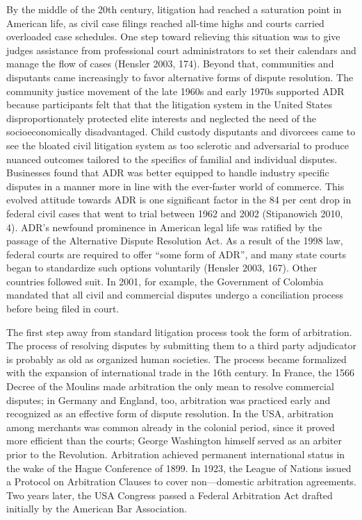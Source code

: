 By the middle of the 20th century, litigation had reached a saturation point in American life, as civil case filings reached all-time highs and courts carried overloaded case schedules. One step toward relieving this situation was to give judges assistance from professional court administrators to set their calendars and manage the flow of cases (Hensler 2003, 174). Beyond that, communities and disputants came increasingly to favor alternative forms of dispute resolution. The community justice movement of the late 1960s and early 1970s supported ADR because participants felt that that the litigation system in the United States disproportionately protected elite interests and neglected the need of the socioeconomically disadvantaged. Child custody disputants and divorcees came to see the bloated civil litigation system as too sclerotic and adversarial to produce nuanced outcomes tailored to the specifics of familial and individual disputes. Businesses found that ADR was better equipped to handle industry specific disputes in a manner more in line with the ever-faster world of commerce. This evolved attitude towards ADR is one significant factor in the 84 per cent drop in federal civil cases that went to trial between 1962 and 2002 (Stipanowich 2010, 4). ADR's newfound prominence in American legal life was ratified by the passage of the Alternative Dispute Resolution Act. As a result of the 1998 law, federal courts are required to offer ``some form of ADR'', and many state courts began to standardize such options voluntarily (Hensler 2003, 167). Other countries followed suit. In 2001, for example, the Government of Colombia mandated that all civil and commercial disputes undergo a conciliation process before being filed in court.

The first step away from standard litigation process took the form of arbitration. The process of resolving disputes by submitting them to a third party adjudicator is probably as old as organized human societies. The process became formalized with the expansion of international trade in the 16th century. In France, the 1566 Decree of the Moulins made arbitration the only mean to resolve commercial disputes; in Germany and England, too, arbitration was practiced early and recognized as an effective form of dispute resolution. In the USA, arbitration among merchants was common already in the colonial period, since it proved more efficient than the courts; George Washington himself served as an arbiter prior to the Revolution. Arbitration achieved permanent international status in the wake of the Hague Conference of 1899. In 1923, the League of Nations issued a Protocol on Arbitration Clauses to cover non---domestic arbitration agreements. Two years later, the USA Congress passed a Federal Arbitration Act drafted initially by the American Bar Association.

